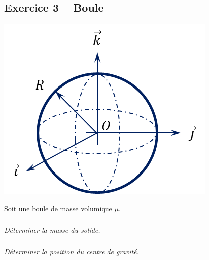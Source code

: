 \documentclass[10pt]{article}
\begin{document}
\subsection*{Exercice 3 -- Boule}
\setcounter{subparagraph}{0}
\begin{minipage}[c]{.3\linewidth}
\begin{center}
\includegraphics[width=.95\textwidth]{images/sphere_2}
\end{center}
\end{minipage} \hfill
\begin{minipage}[c]{.65\linewidth}
Soit une boule de masse volumique $\mu$.
\subparagraph{}
\textit{Déterminer la masse du solide.}
\subparagraph{}
\textit{Déterminer la position du centre de gravité.}
\end{minipage}
\end{document}

